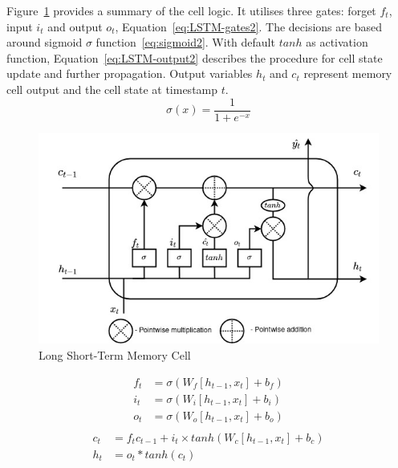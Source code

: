 {
\mbox{Figure~\ref{fig:LSTM-cell2}} provides a summary of the cell logic.
It utilises three gates: forget $f_t$, input $i_t$ and output $o_t$, \mbox{Equation~\ref{eq:LSTM-gates2}}.
The decisions are based around sigmoid $\sigma$ function~\ref{eq:sigmoid2}.
With default $tanh$ as activation function, \mbox{Equation~\ref{eq:LSTM-output2}} describes the procedure for cell state update and further propagation.
Output variables $h_t$ and $c_t$ represent memory cell output and the cell state at timestamp $t$.
\begin{equation}
    \sigma(x) = \frac{1}{1+e^{-x}}
    \label{eq:sigmoid2}
\end{equation}
\begin{figure}[htbp]
    \centering
    \includegraphics[width=\linewidth]{II_Body/LSTM/images/LSTM.jpg}
    \caption{Long Short-Term Memory Cell}
    \label{fig:LSTM-cell2}
\end{figure}
\begin{equation}
    \begin{split}
        f_t &= \sigma \left(W_f \left[h_{t-1}, x_t \right] + b_f \right) \\
        i_t &= \sigma \left(W_i \left[h_{t-1}, x_t \right] + b_i \right) \\
        o_t &= \sigma \left(W_o \left[h_{t-1}, x_t \right] + b_o \right) \\    
    \end{split}
    \label{eq:LSTM-gates2}
\end{equation}
\begin{equation}
    \begin{split}
        c_t &= f_t c_{t-1}+i_t \times tanh \left(W_c \left[h_{t-1}, x_t \right] + b_c \right) \\
        h_t &= o_t*tanh \left(c_t \right)
    \end{split}
    \label{eq:LSTM-output2}
\end{equation}
}

